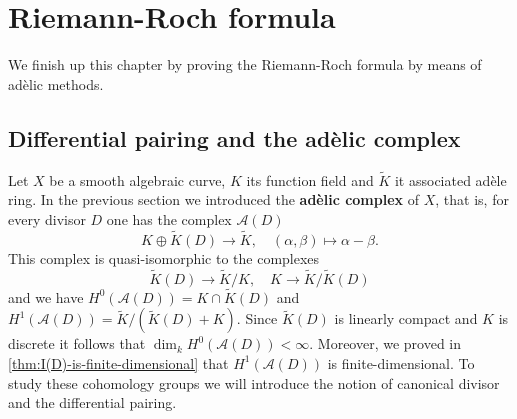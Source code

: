 \section{Riemann-Roch formula}
We finish up this chapter by proving the Riemann-Roch formula by means of adèlic methods. 

\subsection{Differential pairing and the adèlic complex}
Let $X$ be a smooth algebraic curve, $K$ its function field and $\widetilde{K}$ it associated adèle ring. In the previous section we introduced the \textbf{adèlic complex} of $X$, that is, for every divisor $D$ one has the complex $\mathcal{A}(D)$ 
\[
	K\oplus \widetilde{K}(D) \to \widetilde{K}, \quad (\alpha,\beta) \mapsto \alpha - \beta.
\]
This complex is quasi-isomorphic to the complexes
\[
	\widetilde{K}(D) \to \widetilde{K}/K, \quad K\to \widetilde{K}/\widetilde{K}(D)
\]
and we have $H^{0}(\mathcal{A}(D)) = K \cap \widetilde{K}(D)$ and $H^{1}(\mathcal{A}(D)) = \widetilde{K}/(\widetilde{K}(D) + K)$. Since $\widetilde{K}(D)$ is linearly compact and $K$ is discrete it follows that $\dim_{k}H^{0}(\mathcal{A}(D)) < \infty$. Moreover, we proved in \cref{thm:I(D)-is-finite-dimensional} that $H^{1}(\mathcal{A}(D))$ is finite-dimensional. To study these cohomology groups we will introduce the notion of canonical divisor and the differential pairing.
\vspace{5mm}

